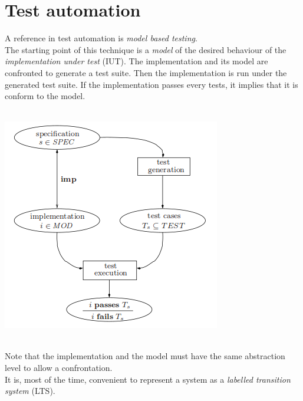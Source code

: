 \documentclass[a4paper]{report}
\begin{document}
\section*{Test automation}
A reference in test automation is \textit{model based testing}.\\
The starting point of this technique is a \textit{model} of the desired behaviour of the \textit{implementation under test} (IUT). The implementation and its model are confronted to generate a test suite. Then the implementation is run under the generated test suite. If the implementation passes every tests, it implies that it is conform to the model.\\
\newline
$ $\\
\centerline{
  \includegraphics[scale=0.5]{img/modelBasedTesting.png}
}
$ $\\

Note that the implementation and the model must have the same abstraction level to allow a confrontation.\\
It is, most of the time, convenient to represent a system as a \textit{labelled transition system} (LTS).\\
\newline
\end{document}
